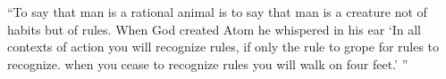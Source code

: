``To say that man is a rational animal is to say that man is a creature not of
habits but of rules. When God created Atom he whispered in his ear `In all
contexts of action you will recognize rules, if only the rule to grope for rules
to recognize. when you cease to recognize rules you will walk on four feet.' ''
